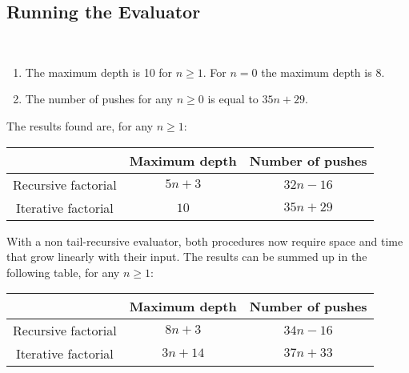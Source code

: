\subsection{Running the Evaluator}

\begin{exe}[5.26]
    \ \vspace{-20pt}
    \begin{enumerate}
	\item The maximum depth is 10 for $n \geq 1$. For $n = 0$ the maximum 
	depth is 8.

    \item The number of pushes for any $n \geq 0$ is equal to $35n + 29$.
    \end{enumerate}
\end{exe}

\begin{exe}[5.27]
    The results found are, for any $n \geq 1$:
    \begin{center}
	\begin{tabular}{|c|c|c|}
	    \hline
	    & Maximum depth & Number of pushes \\\hline
	    Recursive factorial & $5n + 3$ & $32n - 16$ \\\hline
	    Iterative factorial & $10$ & $35n + 29$ \\\hline
	\end{tabular}
    \end{center}
\end{exe}

\begin{exe}[5.28]
    With a non tail-recursive evaluator, both procedures now require space and 
    time that grow linearly with their input. The results can be summed up in 
    the following table, for any $n \geq 1$:
    \begin{center}
	\begin{tabular}{|c|c|c|}
	    \hline
	    & Maximum depth & Number of pushes \\\hline
	    Recursive factorial & $8n + 3$ & $34n - 16$ \\\hline
	    Iterative factorial & $3n + 14$ & $37n + 33$ \\\hline
	\end{tabular}
    \end{center}
\end{exe}

